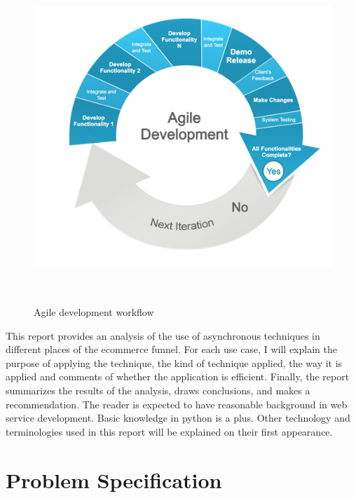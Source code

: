 \documentclass[12pt]{article}
\begin{document}
\begin{figure}[ht!]
\centering
\includegraphics[width=12.5cm,height=12.5cm,keepaspectratio]{img/agile.png}
\caption{Agile development workflow}
\label{overflow}
\end{figure}

This report provides an analysis of the use of asynchronous techniques in different places of the ecommerce funnel. For each use case, I will explain the purpose of applying the technique, the kind of technique applied, the way it is applied and comments of whether the application is efficient. Finally, the report summarizes the results of the analysis, draws conclusions, and makes a recommendation. The reader is expected to have reasonable background in web service development. Basic knowledge in python is a plus. Other technology and terminologies used in this report will be explained on their first appearance.\\



\newpage

\section{Problem Specification}
\end{document}
